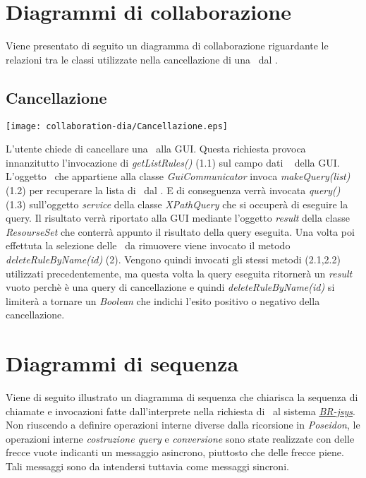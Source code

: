 \section{Diagrammi di collaborazione}
Viene presentato di seguito un diagramma di collaborazione riguardante le relazioni tra le classi utilizzate nella cancellazione di una \br\ dal \rp.

\subsection{Cancellazione \br}
\begin{center}
 \texttt{[image: collaboration-dia/Cancellazione.eps]}
\end{center}
L'utente chiede di cancellare una \br\ alla GUI. Questa richiesta provoca innanzitutto l'invocazione di \textit{getListRules()} (1.1) sul campo dati \textit{\rp\ } della GUI. L'oggetto \rp\ che appartiene alla classe \textit{GuiCommunicator} invoca \textit{makeQuery(list)} (1.2) per recuperare la lista di \brs\ dal \rp. E di conseguenza verr\`a invocata \textit{query()} (1.3) sull'oggetto \textit{service} della classe \textit{XPathQuery} che si occuper\`a di eseguire la query. Il risultato verr\`a riportato alla GUI mediante l'oggetto \textit{result} della classe \textit{ResourseSet} che conterr\`a appunto il risultato della query eseguita. Una volta poi effettuta la selezione delle \brs\ da rimuovere viene invocato il metodo \textit{deleteRuleByName(id)} (2). Vengono quindi invocati gli stessi metodi (2.1,2.2) utilizzati precedentemente, ma questa volta la query eseguita ritorner\`a un \textit{result} vuoto perch\`e \`e una query di cancellazione e quindi \textit{deleteRuleByName(id)} si limiter\`a a tornare un \textit{Boolean} che indichi l'esito positivo o negativo della cancellazione.

\section{Diagrammi di sequenza}
Viene di seguito illustrato un diagramma di sequenza che chiarisca la sequenza di chiamate e invocazioni fatte dall'interprete nella richiesta di \brs\ al sistema \textit{\underline{BR-jsys}}. Non riuscendo a definire operazioni interne diverse dalla ricorsione in \textit{Poseidon}, le operazioni interne \textit{costruzione query} e \textit{conversione} sono state realizzate con delle frecce vuote indicanti un messaggio asincrono, piuttosto che delle frecce piene. Tali messaggi sono da intendersi tuttavia come messaggi sincroni.
